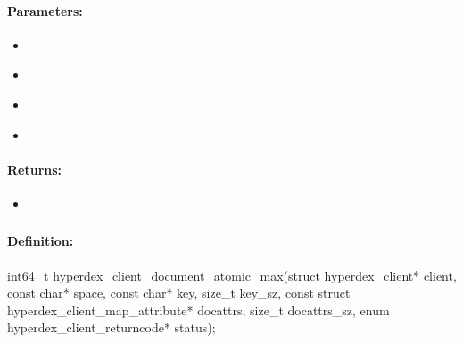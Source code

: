 \paragraph{Parameters:}
\begin{itemize}[noitemsep]
\item {}\\

\item {}\\

\item {}\\

\item {}\\

\end{itemize}

\paragraph{Returns:}
\begin{itemize}[noitemsep]
\item {}\\

\end{itemize}

\pagebreak
\subsubsection{}
\label{api:c:document_atomic_max}


\paragraph{Definition:}
\begin{ccode}
int64_t hyperdex_client_document_atomic_max(struct hyperdex_client* client,
        const char* space,
        const char* key, size_t key_sz,
        const struct hyperdex_client_map_attribute* docattrs, size_t docattrs_sz,
        enum hyperdex_client_returncode* status);
\end{ccode}

